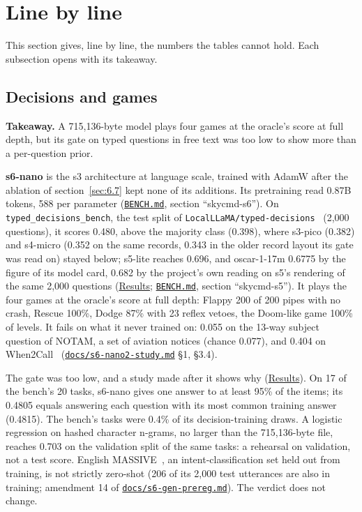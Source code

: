 \documentclass[10pt]{article}
\begin{document}
\section{Line by line}\label{sec:6}

This section gives, line by line, the numbers the tables cannot hold. Each subsection opens with its takeaway.

\subsection{Decisions and games}\label{sec:6.1}

\textbf{Takeaway.} A 715,136-byte model plays four games at the oracle's score at full depth, but its gate on typed questions in free text was too low to show more than a per-question prior.

\textbf{s6-nano} is the s3 architecture at language scale, trained with AdamW after the ablation of section~\ref{sec:6.7} kept none of its additions. Its pretraining read 0.87B tokens, 588 per parameter (\href{https://github.com/maxgfr/skycmd/blob/main/BENCH.md}{\texttt{BENCH.md}}, section ``skycmd-s6''). On \texttt{typed\_\allowbreak{}decisions\_\allowbreak{}bench}, the test split of \texttt{LocalLLaMA/\allowbreak{}typed-decisions}~\cite{typeddecisions} (2,000 questions), it scores 0.480, above the majority class (0.398), where s3-pico (0.382) and s4-micro (0.352 on the same records, 0.343 in the older record layout its gate was read on) stayed below; s5-lite reaches 0.696, and oscar-1-17m 0.6775 by the figure of its model card, 0.682 by the project's own reading on s5's rendering of the same 2,000 questions (\href{https://maxgfr.github.io/skycmd/results/\#s6-nano-passed-published-at-full-depth}{Results}; \href{https://github.com/maxgfr/skycmd/blob/main/BENCH.md}{\texttt{BENCH.md}}, section ``skycmd-s5''). It plays the four games at the oracle's score at full depth: Flappy 200 of 200 pipes with no crash, Rescue 100\%, Dodge 87\% with 23 reflex vetoes, the Doom-like game 100\% of levels. It fails on what it never trained on: 0.055 on the 13-way subject question of NOTAM, a set of aviation notices (chance 0.077), and 0.404 on When2Call~\cite{when2call} (\href{https://github.com/maxgfr/skycmd/blob/main/docs/s6-nano2-study.md}{\texttt{docs/\allowbreak{}s6-nano2-study.md}} \S{}1, \S{}3.4).

The gate was too low, and a study made after it shows why (\href{https://maxgfr.github.io/skycmd/results/\#s6-nano-what-the-gate-did-not-measure}{Results}). On 17 of the bench's 20 tasks, s6-nano gives one answer to at least 95\% of the items; its 0.4805 equals answering each question with its most common training answer (0.4815). The bench's tasks were 0.4\% of its decision-training draws. A logistic regression on hashed character n-grams, no larger than the 715,136-byte file, reaches 0.703 on the validation split of the same tasks: a rehearsal on validation, not a test score. English MASSIVE~\cite{fitzgerald2023massive}, an intent-classification set held out from training, is not strictly zero-shot (206 of its 2,000 test utterances are also in training; amendment 14 of \href{https://github.com/maxgfr/skycmd/blob/main/docs/s6-gen-prereg.md}{\texttt{docs/\allowbreak{}s6-gen-prereg.md}}). The verdict does not change.
\end{document}
